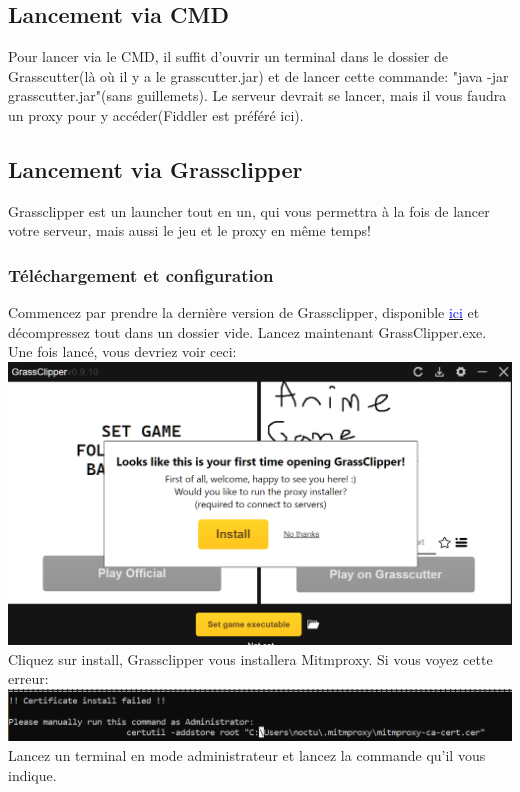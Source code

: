 \documentclass{article}
\begin{document}
\subsection{Lancement via CMD}
Pour lancer via le CMD, il suffit d'ouvrir un terminal dans le dossier de Grasscutter(là où il y a le grasscutter.jar) et de lancer cette commande: "java -jar grasscutter.jar"(sans guillemets). Le serveur devrait se lancer, mais il vous faudra un proxy pour y accéder(Fiddler est préféré ici).

\subsection{Lancement via Grassclipper}
Grassclipper est un launcher tout en un, qui vous permettra à la fois de lancer votre serveur, mais aussi le jeu et le proxy en même temps!

\subsubsection{Téléchargement et configuration}
Commencez par prendre la dernière version de Grassclipper, disponible \href{https://github.com/Grasscutters/GrassClipper/releases}{\textcolor{blue}{ici}} et décompressez tout dans un dossier vide.\newline
Lancez maintenant GrassClipper.exe.\newline
Une fois lancé, vous devriez voir ceci:\newline
\includegraphics[scale=0.5]{img/first_grassclipper_use.png}\newline
Cliquez sur install, Grassclipper vous installera Mitmproxy.\newline
Si vous voyez cette erreur:\newline
\includegraphics[scale=0.5]{img/error_cert.png}\newline
Lancez un terminal en mode administrateur et lancez la commande qu'il vous indique.
\newline\newline
\end{document}

